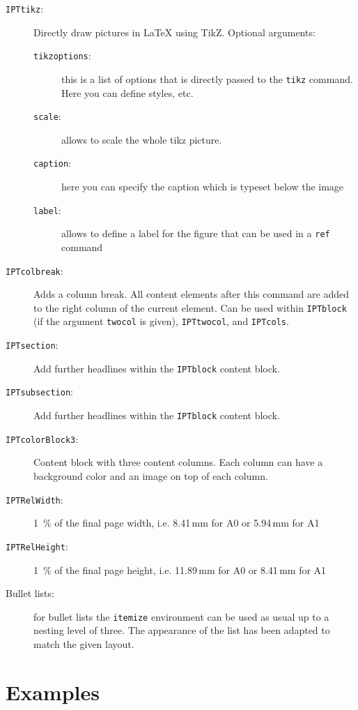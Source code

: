 \begin{description}
	\item[\texttt{\bs{}IPTtikz}:] Directly draw pictures in \LaTeX{} using TikZ.
	Optional arguments:
	\begin{description}
		\item[\texttt{tikzoptions}:] this is a list of options that is directly passed to the \texttt{tikz} command. Here you can define styles, etc.
		\item[\texttt{scale}:] allows to scale the whole tikz picture.
		\item[\texttt{caption}:] here you can specify the caption which is typeset below the image
		\item[\texttt{label}:] allows to define a label for the figure that can be used in a \texttt{\bs{}ref} command
	\end{description}

	\item[\texttt{\bs{}IPTcolbreak}:] Adds a column break. All content elements after this command are added to the right column of the current element. Can be used within \texttt{IPTblock} (if the argument \texttt{twocol} is given), \texttt{IPTtwocol}, and \texttt{IPTcols}.

	\item[\texttt{\bs{}IPTsection}:] Add further headlines within the \texttt{\bs{}IPTblock} content block.

	\item[\texttt{\bs{}IPTsubsection}:] Add further headlines within the \texttt{\bs{}IPTblock} content block.

	\item[\texttt{IPTcolorBlock3}:] Content block with three content columns. Each column can have a background color and an image on top of each column.

	\item[\texttt{IPTRelWidth}:] 1~\% of the final page width, i.e. 8.41\,mm for A0 or 5.94\,mm for A1

	\item[\texttt{IPTRelHeight}:] 1~\% of the final page height, i.e. 11.89\,mm for A0 or 8.41\,mm for A1

	\item[Bullet lists:] for bullet lists the \texttt{itemize} environment can be used as usual up to a nesting level of three. The appearance of the list has been adapted to match the given layout.

\end{description}


\section{Examples}

